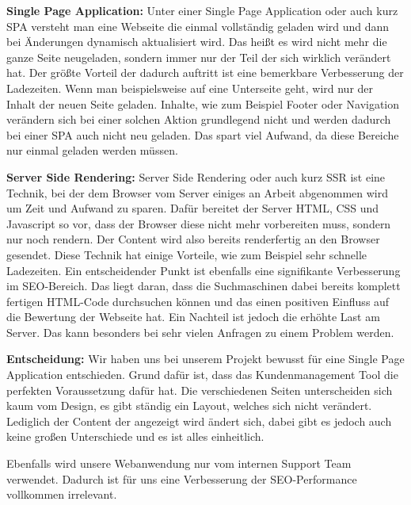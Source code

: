 \textbf{Single Page Application:}
\newline
Unter einer Single Page Application oder auch kurz SPA versteht man eine Webseite die einmal vollständig geladen wird und dann bei Änderungen dynamisch aktualisiert wird. Das heißt es wird nicht mehr die ganze Seite neugeladen, sondern immer nur der Teil der sich wirklich verändert hat. Der größte Vorteil der dadurch auftritt ist eine bemerkbare Verbesserung der Ladezeiten. Wenn man beispielsweise auf eine Unterseite geht, wird nur der Inhalt der neuen Seite geladen. Inhalte, wie zum Beispiel Footer oder Navigation verändern sich bei einer solchen Aktion grundlegend nicht und werden dadurch bei einer SPA auch nicht neu geladen. Das spart viel Aufwand, da diese Bereiche nur einmal geladen werden müssen.

\cite{frontend_spa}

\textbf{Server Side Rendering:}
\newline
Server Side Rendering oder auch kurz SSR ist eine Technik, bei der dem Browser vom Server einiges an Arbeit abgenommen wird um Zeit und Aufwand zu sparen. Dafür bereitet der Server HTML, CSS und Javascript so vor, dass der Browser diese nicht mehr vorbereiten muss, sondern nur noch rendern. Der Content wird also bereits renderfertig an den Browser gesendet.
Diese Technik hat einige Vorteile, wie zum Beispiel sehr schnelle Ladezeiten. Ein entscheidender Punkt ist ebenfalls eine signifikante Verbesserung im SEO-Bereich. Das liegt daran, dass die Suchmaschinen dabei bereits komplett fertigen HTML-Code durchsuchen können und das einen positiven Einfluss auf die Bewertung der Webseite hat. 
Ein Nachteil ist jedoch die erhöhte Last am Server. Das kann besonders bei sehr vielen Anfragen zu einem Problem werden.

\cite{frontend_ssr}

\textbf{Entscheidung:}
\newline
Wir haben uns bei unserem Projekt bewusst für eine Single Page Application entschieden. Grund dafür ist, dass das Kundenmanagement Tool die perfekten Voraussetzung dafür hat. Die verschiedenen Seiten unterscheiden sich kaum vom Design, es gibt ständig ein Layout, welches sich nicht verändert. Lediglich der Content der angezeigt wird ändert sich, dabei gibt es jedoch auch keine großen Unterschiede und es ist alles einheitlich.

Ebenfalls wird unsere Webanwendung nur vom internen Support Team verwendet. Dadurch ist für uns eine Verbesserung der SEO-Performance vollkommen irrelevant.